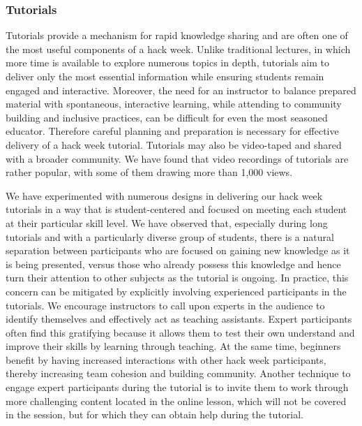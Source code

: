 \documentclass{aastex62}
\begin{document}
\subsubsection{Tutorials}
Tutorials provide a mechanism for rapid knowledge sharing and are often one of the most useful components of a hack week. Unlike traditional lectures, in which more time is available to explore numerous topics in depth, tutorials aim to deliver only the most essential information while ensuring students remain engaged and interactive. Moreover, the need for an instructor to balance prepared material with spontaneous, interactive learning, while attending to community building and inclusive practices, can be difficult for even the most seasoned educator. Therefore careful planning and preparation is necessary for effective delivery of a hack week tutorial. Tutorials may also be video-taped and shared with a broader community. We have found that video recordings of tutorials are rather popular, with some of them drawing more than 1,000 views.

We have experimented with numerous designs in delivering our hack week tutorials in a way that is student-centered and focused on meeting each student at their particular skill level. We have observed that, especially during long tutorials and with a particularly diverse group of students, there is a natural separation between participants who are focused on gaining new knowledge as it is being presented, versus those who already possess this knowledge and hence turn their attention to other subjects as the tutorial is ongoing. In practice, this concern can be mitigated by explicitly involving experienced participants in the tutorials. We encourage instructors to call upon experts in the audience to identify themselves and effectively act as teaching assistants. Expert participants often find this gratifying because it allows them to test their own understand and improve their skills by learning through teaching. At the same time, beginners benefit by having increased interactions with other hack week participants, thereby increasing team cohesion and building community. Another technique to engage expert participants during the tutorial is to invite them to work through more challenging content located in the online lesson, which will not be covered in the session, but for which they can obtain help during the tutorial.
\end{document}
